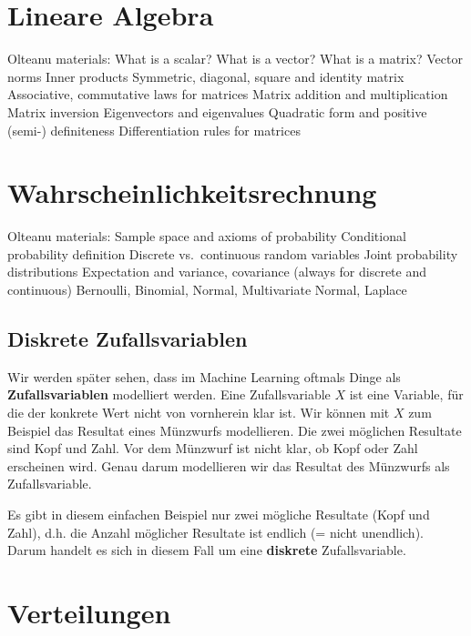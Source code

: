 \documentclass[
]{book}
\begin{document}
\hypertarget{lineare-algebra}{%
\section{Lineare Algebra}\label{lineare-algebra}}

Olteanu materials:
What is a scalar? What is a vector? What is a matrix?
Vector norms
Inner products
Symmetric, diagonal, square and identity matrix
Associative, commutative laws for matrices
Matrix addition and multiplication
Matrix inversion
Eigenvectors and eigenvalues
Quadratic form and positive (semi-) definiteness
Differentiation rules for matrices

\hypertarget{wahrscheinlichkeitsrechnung}{%
\section{Wahrscheinlichkeitsrechnung}\label{wahrscheinlichkeitsrechnung}}

Olteanu materials:
Sample space and axioms of probability
Conditional probability definition
Discrete vs.~continuous random variables
Joint probability distributions
Expectation and variance, covariance (always for discrete and continuous)
Bernoulli, Binomial, Normal, Multivariate Normal, Laplace

\hypertarget{diskrete-zufallsvariablen}{%
\subsection{Diskrete Zufallsvariablen}\label{diskrete-zufallsvariablen}}

Wir werden später sehen, dass im Machine Learning oftmals Dinge als \textbf{Zufallsvariablen} modelliert werden. Eine Zufallsvariable \(X\) ist eine Variable, für die der konkrete Wert nicht von vornherein klar ist. Wir können mit \(X\) zum Beispiel das Resultat eines Münzwurfs modellieren. Die zwei möglichen Resultate sind Kopf und Zahl. Vor dem Münzwurf ist nicht klar, ob Kopf oder Zahl erscheinen wird. Genau darum modellieren wir das Resultat des Münzwurfs als Zufallsvariable.

Es gibt in diesem einfachen Beispiel nur zwei mögliche Resultate (Kopf und Zahl), d.h. die Anzahl möglicher Resultate ist endlich (= nicht unendlich). Darum handelt es sich in diesem Fall um eine \textbf{diskrete} Zufallsvariable.

\hypertarget{verteilungen}{%
\section{Verteilungen}\label{verteilungen}}
\end{document}
